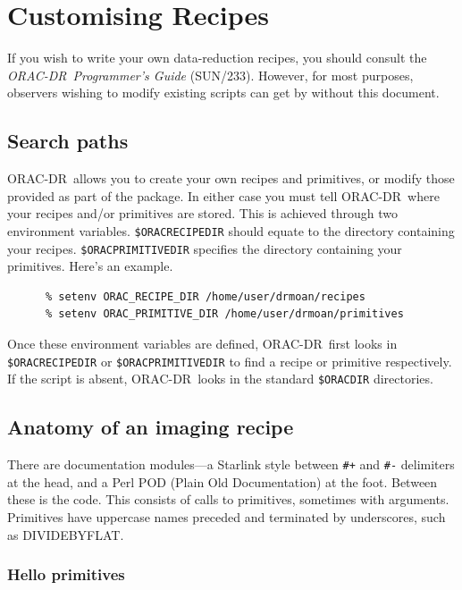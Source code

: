 \documentclass[twoside,11pt]{article}
\newcommand{\xref}[3]{#1}
\newcommand{\xlabel}[1]{}
\renewcommand{\_}{\texttt{\symbol{95}}}
\newcommand{\ORACDR}{{\footnotesize ORAC-DR}}
\begin{document}
\section{\xlabel{customising_recipes}Customising
Recipes\label{customising_recipes}}

If you wish to write your own data-reduction recipes, you should
consult the {\em \ORACDR\ Programmer's Guide\/}
(\xref{SUN/233}{sun233}{}).  However, for most purposes, observers
wishing to modify existing scripts can get by without this document.

\subsection{\xlabel{search_paths}Search paths\label{search_paths}}

\ORACDR\ allows you to create your own recipes and primitives, or
modify those provided as part of the package.  In either case you must
tell \ORACDR\ where your recipes and/or primitives are stored.  This
is achieved through two environment variables.  {\tt\$ORAC\_RECIPE\_DIR}
should equate to the directory containing your recipes.
{\tt \$ORAC\_PRIMITIVE\_DIR} specifies the directory containing your
primitives.  Here's an example.

\begin{verbatim}
      % setenv ORAC_RECIPE_DIR /home/user/drmoan/recipes
      % setenv ORAC_PRIMITIVE_DIR /home/user/drmoan/primitives
\end{verbatim}

Once these environment variables are defined, \ORACDR\ first looks in
{\tt \$ORAC\_RECIPE\_DIR} or {\tt \$ORAC\_PRIMITIVE\_DIR} to find a recipe or
primitive respectively.  If the script is absent, \ORACDR\ looks in
the standard {\tt \$ORAC\_DIR} directories.

\subsection{\xlabel{anatomy_of_an_imaging_recipe}Anatomy of an imaging recipe}

There are documentation modules---a Starlink style between \verb/#+/ and
\verb/#-/ delimiters at the head, and a Perl POD (Plain Old
Documentation) at the foot.  Between these is the code.  This consists
of calls to primitives, sometimes with arguments.  Primitives have
uppercase names preceded and terminated by underscores, such as
\_DIVIDE\_BY\_FLAT\_.

\subsubsection{\xlabel{hello_primitives}Hello primitives}
\end{document}
